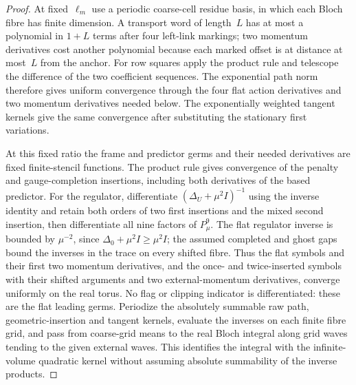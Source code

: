\begin{proof}
At fixed~$\ell_m$ use a periodic coarse-cell residue basis, in which each Bloch fibre has finite dimension. A transport word of length~$L$ has at most a polynomial in $1+L$ terms after four left-link markings; two momentum derivatives cost another polynomial because each marked offset is at distance at most~$L$ from the anchor. For row squares apply the product rule and telescope the difference of the two coefficient sequences. The exponential path norm therefore gives uniform convergence through the four flat action derivatives and two momentum derivatives needed below. The exponentially weighted tangent kernels give the same convergence after substituting the stationary first variations.

At this fixed ratio the frame and predictor germs and their needed derivatives are fixed finite-stencil functions. The product rule gives convergence of the penalty and gauge-completion insertions, including both derivatives of the based predictor. For the regulator, differentiate $(\Delta_U+\mu^2I)^{-1}$ using the inverse identity and retain both orders of two first insertions and the mixed second insertion, then differentiate all nine factors of $P_\mu^9$. The flat regulator inverse is bounded by $\mu^{-2}$, since $\Delta_0+\mu^2I\ge\mu^2I$; the assumed completed and ghost gaps bound the inverses in the trace on every shifted fibre. Thus the flat symbols and their first two momentum derivatives, and the once- and twice-inserted symbols with their shifted arguments and two external-momentum derivatives, converge uniformly on the real torus. No flag or clipping indicator is differentiated: these are the flat leading germs. Periodize the absolutely summable raw path, geometric-insertion and tangent kernels, evaluate the inverses on each finite fibre grid, and pass from coarse-grid means to the real Bloch integral along grid waves tending to the given external waves. This identifies the integral with the infinite-volume quadratic kernel without assuming absolute summability of the inverse products.


\end{proof}
